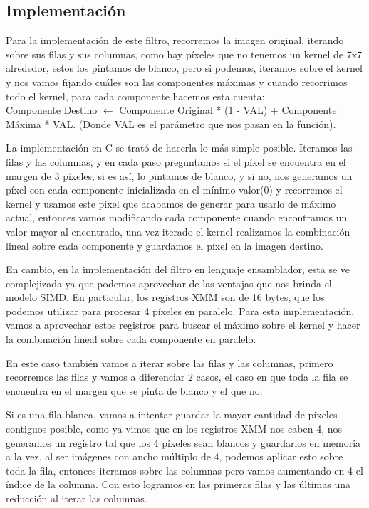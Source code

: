 \subsection{Implementación}

Para la implementación de este filtro, recorremos la imagen original, iterando sobre sus filas y sus columnas, como hay píxeles que no tenemos un kernel de 7x7 alrededor, estos los pintamos de blanco, pero si podemos, iteramos sobre el kernel y nos vamos fijando cuáles son las componentes máximas y cuando recorrimos todo el kernel, para cada componente hacemos esta cuenta: \\ Componente Destino $\leftarrow$ Componente Original * (1 - VAL) + Componente Máxima * VAL. (Donde VAL es el parámetro que nos pasan en la función).
 
La implementación en C se trató de hacerla lo más simple posible. Iteramos las filas y las columnas, y en cada paso preguntamos si el píxel se encuentra en el margen de 3 píxeles, si es así, lo pintamos de blanco, y si no, nos generamos un píxel con cada componente inicializada en el mínimo valor(0) y recorremos el kernel y usamos este píxel que acabamos de generar para usarlo de máximo actual, entonces vamos modificando cada componente cuando encontramos un valor mayor al encontrado, una vez iterado el kernel realizamos la combinación lineal sobre cada componente y guardamos el píxel en la imagen destino.
 
En cambio, en la implementación del filtro en lenguaje ensamblador, esta se ve complejizada ya que podemos aprovechar de las ventajas que nos brinda el modelo SIMD. En particular, los registros XMM son de 16 bytes, que los podemos utilizar para procesar 4 píxeles en paralelo. Para esta implementación, vamos a aprovechar estos registros para buscar el máximo sobre el kernel y hacer la combinación lineal sobre cada componente en paralelo.
 
En este caso también vamos a iterar sobre las filas y las columnas, primero recorremos las filas y vamos a diferenciar 2 casos, el caso en que toda la fila se encuentra en el margen que se pinta de blanco y el que no.
 
Si es una fila blanca, vamos a intentar guardar la mayor cantidad de píxeles contiguos posible, como ya vimos que en los registros XMM nos caben 4, nos generamos un registro tal que los 4 píxeles sean blancos y guardarlos en memoria a la vez, al ser imágenes con ancho múltiplo de 4, podemos aplicar esto sobre toda la fila, entonces iteramos sobre las columnas pero vamos aumentando en 4 el índice de la columna. Con esto logramos en las primeras filas y las últimas una reducción al iterar las columnas.
 
